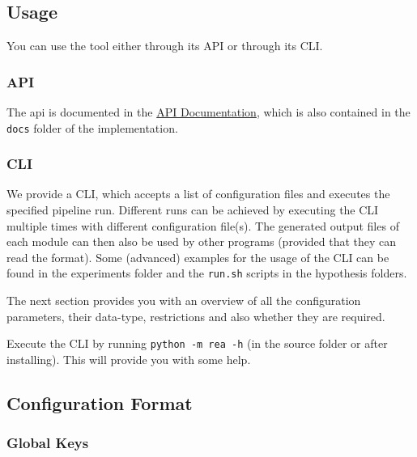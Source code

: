 \documentclass[
]{article}
\begin{document}
\hypertarget{usage}{%
\subsection{Usage}\label{usage}}

You can use the tool either through its API or through its CLI.

\hypertarget{api}{%
\subsubsection{API}\label{api}}

The api is documented in the \href{../20_API_Docs/html/index.html}{API
Documentation}, which is also contained in the \texttt{docs} folder of
the implementation.

\hypertarget{cli}{%
\subsubsection{CLI}\label{cli}}

We provide a CLI, which accepts a list of configuration files and
executes the specified pipeline run. Different runs can be achieved by
executing the CLI multiple times with different configuration file(s).
The generated output files of each module can then also be used by other
programs (provided that they can read the format). Some (advanced)
examples for the usage of the CLI can be found in the experiments folder
and the \texttt{run.sh} scripts in the hypothesis folders.

The next section provides you with an overview of all the configuration
parameters, their data-type, restrictions and also whether they are
required.

Execute the CLI by running \texttt{python\ -m\ rea\ -h} (in the source
folder or after installing). This will provide you with some help.

\hypertarget{configuration-format}{%
\subsection{Configuration Format}\label{configuration-format}}

\hypertarget{global-keys}{%
\subsubsection{Global Keys}\label{global-keys}}
\end{document}
